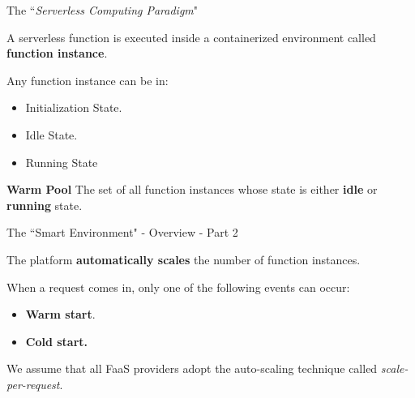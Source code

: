\documentclass[13.5pt]{beamer}
\begin{document}
\begin{frame}{The ``\textit{Serverless Computing Paradigm}"}
	
	\begin{alertblock}{}
		A serverless function is executed inside a containerized environment called \textbf{function instance}.
	\end{alertblock}
	Any function instance can be in:
	\begin{itemize}
		\item Initialization State.
		\item Idle State.
		\item Running State
	\end{itemize}
	\vspace{\baselineskip}
	\begin{alertblock}{\textbf{Warm Pool}}
		The set of all function instances whose state is either \textbf{idle} or \textbf{running} state.
	\end{alertblock}
	
	
	
\end{frame} 
\begin{frame}{The ``Smart Environment" - Overview - Part 2}
	
\begin{alertblock}{}
	The platform \textbf{automatically scales} the number of function instances.
\end{alertblock}
\vspace{\baselineskip}
When a request comes in, only one of the following events can occur:
\begin{itemize}
	\item \textbf{Warm start}.
	\item \textbf{Cold start.}
\end{itemize}
\vspace{\baselineskip}
\begin{block}{}
	We assume that all FaaS providers adopt the auto-scaling technique called \textit{scale-per-request}.
\end{block}
	
	
\end{frame} 
\end{document}
